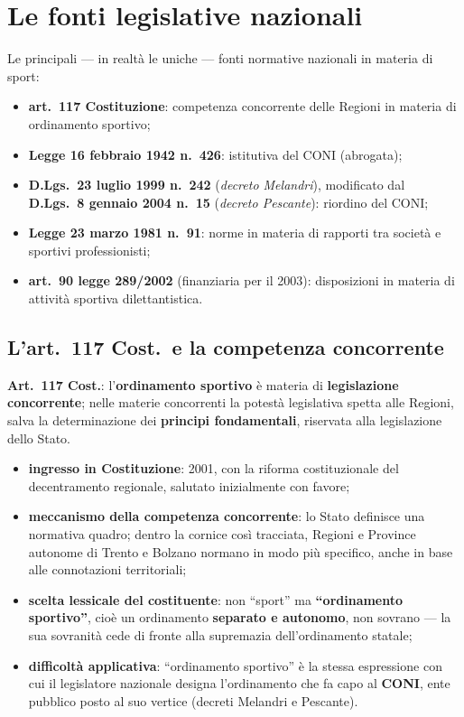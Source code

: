 \section{Le fonti legislative nazionali}

Le principali --- in realtà le uniche --- fonti normative nazionali in materia di sport:

\begin{itemize}
  \item \textbf{art.\ 117 Costituzione}: competenza concorrente delle Regioni in materia di
    ordinamento sportivo;
  \item \textbf{Legge 16 febbraio 1942 n.\ 426}: istitutiva del CONI (abrogata);
  \item \textbf{D.Lgs.\ 23 luglio 1999 n.\ 242} (\textit{decreto Melandri}), modificato dal
    \textbf{D.Lgs.\ 8 gennaio 2004 n.\ 15} (\textit{decreto Pescante}): riordino del CONI;
  \item \textbf{Legge 23 marzo 1981 n.\ 91}: norme in materia di rapporti tra società e sportivi
    professionisti;
  \item \textbf{art.\ 90 legge 289/2002} (finanziaria per il 2003): disposizioni in materia di
    attività sportiva dilettantistica.
\end{itemize}

\subsection{L'art.\ 117 Cost.\ e la competenza concorrente}

\textbf{Art.\ 117 Cost.}: l'\textbf{ordinamento sportivo} è materia di \textbf{legislazione
concorrente}; nelle materie concorrenti la potestà legislativa spetta alle Regioni, salva la
determinazione dei \textbf{principi fondamentali}, riservata alla legislazione dello Stato.

\begin{itemize}
  \item \textbf{ingresso in Costituzione}: 2001, con la riforma costituzionale del decentramento
    regionale, salutato inizialmente con favore;
  \item \textbf{meccanismo della competenza concorrente}: lo Stato definisce una normativa quadro;
    dentro la cornice così tracciata, Regioni e Province autonome di Trento e Bolzano normano in
    modo più specifico, anche in base alle connotazioni territoriali;
  \item \textbf{scelta lessicale del costituente}: non ``sport'' ma \textbf{``ordinamento
    sportivo''}, cioè un ordinamento \textbf{separato e autonomo}, non sovrano --- la sua
    sovranità cede di fronte alla supremazia dell'ordinamento statale;
  \item \textbf{difficoltà applicativa}: ``ordinamento sportivo'' è la stessa espressione con cui
    il legislatore nazionale designa l'ordinamento che fa capo al \textbf{CONI}, ente pubblico
    posto al suo vertice (decreti Melandri e Pescante).
\end{itemize}

